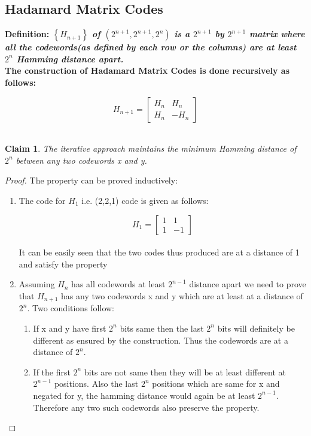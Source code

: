 \documentclass[11pt]{article}
\newtheorem{claim}[theorem]{Claim}
\begin{document}
    \subsection{Hadamard Matrix Codes}
        \bf Definition: \normalfont \textit{$\left\{ H_{n+1} \right\}$ of $(2^{n+1},2^{n+1},2^n)$ is a $2^{n+1}$ by $2^{n+1}$ matrix where all the codewords(as defined by each row or the columns) are at least $2^n$ Hamming distance apart.}\normalfont\\
        The construction of Hadamard Matrix Codes is done recursively as follows:
        
        \[
                H_{n+1} = \left[{ \begin{array}{cc}
                         H_n & H_n\\
                         H_n & -H_n      \end{array} } \right]
            \]\\
            \begin{claim}
                The iterative approach maintains the minimum Hamming distance of $2^n$ between any two codewords x and y.
            \end{claim}
            \begin{proof}
                The property can be proved inductively:
                \begin{enumerate}
                \item The code for $H_1$ i.e. (2,2,1) code is given as follows:
                
                    \[
                        H_1=
                            \left[ {\begin{array}{cc}
                            1 & 1 \\       1 & -1       \end{array} } \right]
                    \]\\
                    It can be easily seen that the two codes thus produced are at a distance of 1 and satisfy the property
                \item Assuming $H_n$ has all codewords at least $2^{n-1}$ distance apart we need to prove that $H_{n+1}$ has any two codewords x and y which are at least at a distance of $2^n$. Two conditions follow:
                    \begin{enumerate}
                        \item If x and y have first $2^n$ bits same then the last $2^n$ bits will definitely be different as ensured by the construction. Thus the codewords are at a distance of $2^n$.
                        \item If the first $2^n$ bits are not same then they will be at least different at $2^{n-1}$ positions. Also the last $2^n$ positions which are same for x and negated for y, the hamming distance would again be at least $2^{n-1}$. Therefore any two such codewords also preserve the property. 
                    \end{enumerate}
            \end{enumerate}
            \end{proof}
\end{document}
